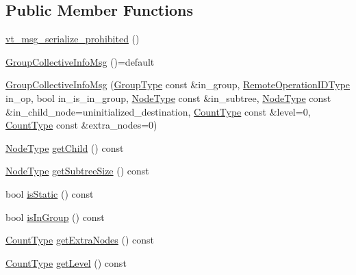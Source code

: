 \subsection*{Public Member Functions}
\begin{DoxyCompactItemize}
\item 
\hyperlink{structvt_1_1group_1_1_group_collective_info_msg_a0738015d12a55f4f95a4bdf328efb6b6}{vt\+\_\+msg\+\_\+serialize\+\_\+prohibited} ()
\item 
\hyperlink{structvt_1_1group_1_1_group_collective_info_msg_a92fdcd49062ed34fdb873b10e33e06f1}{Group\+Collective\+Info\+Msg} ()=default
\item 
\hyperlink{structvt_1_1group_1_1_group_collective_info_msg_acac57af50d715f4fadcceda26dee5d4f}{Group\+Collective\+Info\+Msg} (\hyperlink{namespacevt_a27b5e4411c9b6140c49100e050e2f743}{Group\+Type} const \&in\+\_\+group, \hyperlink{namespacevt_1_1group_a73f2624ddeb535b39a08b6524f26b244}{Remote\+Operation\+I\+D\+Type} in\+\_\+op, bool in\+\_\+is\+\_\+in\+\_\+group, \hyperlink{namespacevt_a866da9d0efc19c0a1ce79e9e492f47e2}{Node\+Type} const \&in\+\_\+subtree, \hyperlink{namespacevt_a866da9d0efc19c0a1ce79e9e492f47e2}{Node\+Type} const \&in\+\_\+child\+\_\+node=uninitialized\+\_\+destination, \hyperlink{structvt_1_1group_1_1_group_collective_info_msg_a3d20316314d3cc3ac13ff4c5250203a5}{Count\+Type} const \&level=0, \hyperlink{structvt_1_1group_1_1_group_collective_info_msg_a3d20316314d3cc3ac13ff4c5250203a5}{Count\+Type} const \&extra\+\_\+nodes=0)
\item 
\hyperlink{namespacevt_a866da9d0efc19c0a1ce79e9e492f47e2}{Node\+Type} \hyperlink{structvt_1_1group_1_1_group_collective_info_msg_a5e4adf90fa896fbb82b80b72edefc7d4}{get\+Child} () const
\item 
\hyperlink{namespacevt_a866da9d0efc19c0a1ce79e9e492f47e2}{Node\+Type} \hyperlink{structvt_1_1group_1_1_group_collective_info_msg_a84b8680a55f3eb8db6f775d2facb2814}{get\+Subtree\+Size} () const
\item 
bool \hyperlink{structvt_1_1group_1_1_group_collective_info_msg_a9d886cc20ca198b4b99914c811414c9d}{is\+Static} () const
\item 
bool \hyperlink{structvt_1_1group_1_1_group_collective_info_msg_a890e4479caa27be0752bbfef967d23db}{is\+In\+Group} () const
\item 
\hyperlink{structvt_1_1group_1_1_group_collective_info_msg_a3d20316314d3cc3ac13ff4c5250203a5}{Count\+Type} \hyperlink{structvt_1_1group_1_1_group_collective_info_msg_af573fdf277066cbd0e7337503177a467}{get\+Extra\+Nodes} () const
\item 
\hyperlink{structvt_1_1group_1_1_group_collective_info_msg_a3d20316314d3cc3ac13ff4c5250203a5}{Count\+Type} \hyperlink{structvt_1_1group_1_1_group_collective_info_msg_a368f82322f36599841188bfe9fb8d4e6}{get\+Level} () const
\end{DoxyCompactItemize}
